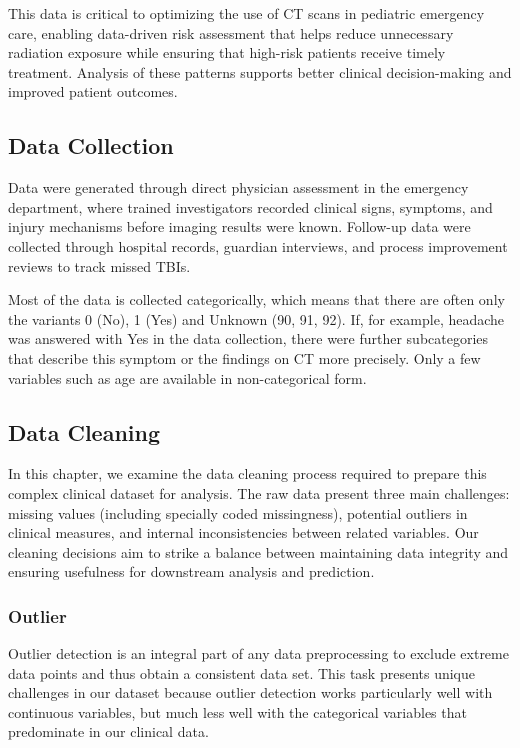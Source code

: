 \documentclass[10pt,letterpaper]{article}
\begin{document}
This data is critical to optimizing the use of CT scans in pediatric emergency care, enabling data-driven risk assessment that helps reduce unnecessary radiation exposure while ensuring that high-risk patients receive timely treatment. Analysis of these patterns supports better clinical decision-making and improved patient outcomes.

\subsection{Data Collection}\label{data-collection}

Data were generated through direct physician assessment in the emergency department, where trained investigators recorded clinical signs, symptoms, and injury mechanisms before imaging results were known. Follow-up data were collected through hospital records, guardian interviews, and process improvement reviews to track missed TBIs.

Most of the data is collected categorically, which means that there are often only the variants 0 (No), 1 (Yes) and Unknown (90, 91, 92). If, for example, headache was answered with Yes in the data collection, there were further subcategories that describe this symptom or the findings on CT more precisely. Only a few variables such as age are available in non-categorical form.

\subsection{Data Cleaning}\label{data-cleaning}

In this chapter, we examine the data cleaning process required to prepare this complex clinical dataset for analysis. The raw data present three main challenges: missing values (including specially coded missingness), potential outliers in clinical measures, and internal inconsistencies between related variables. Our cleaning decisions aim to strike a balance between maintaining data integrity and ensuring usefulness for downstream analysis and prediction.

\subsubsection{Outlier}
Outlier detection is an integral part of any data preprocessing to exclude extreme data points and thus obtain a consistent data set. This task presents unique challenges in our dataset because outlier detection works particularly well with continuous variables, but much less well with the categorical variables that predominate in our clinical data.
\end{document}
